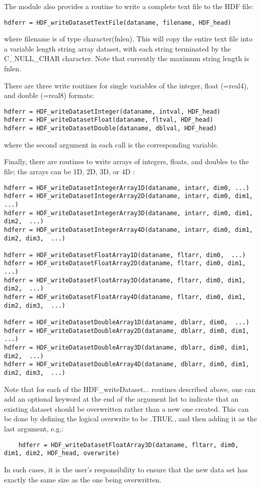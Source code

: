 \documentclass[DIV=calc, paper=letter, fontsize=11pt]{scrartcl}	 %
\begin{document}
The module also provides a routine to write a complete text file to the HDF file:
\begin{verbatim}
hdferr = HDF_writeDatasetTextFile(dataname, filename, HDF_head)
\end{verbatim}
where \textsf{filename} is of type \textsf{character(fnlen)}.  This will copy the entire text file 
into a variable length string array dataset, with each string terminated by the \textsf{C\_NULL\_CHAR}
character.  Note that currently the maximum string length is \textsf{fnlen}.

There are three write routines for single variables of the \textsf{integer}, \textsf{float} (=real4),
and \textsf{double} (=real8) formats:
\begin{verbatim}
hdferr = HDF_writeDatasetInteger(dataname, intval, HDF_head)
hdferr = HDF_writeDatasetFloat(dataname, fltval, HDF_head)
hdferr = HDF_writeDatasetDouble(dataname, dblval, HDF_head)
\end{verbatim}
where the second argument in each call is the corresponding variable.

Finally, there are routines to write arrays of integers, floats, and doubles to the file; the arrays
can be 1D, 2D, 3D, or 4D :
\begin{verbatim}
hdferr = HDF_writeDatasetIntegerArray1D(dataname, intarr, dim0, ...)
hdferr = HDF_writeDatasetIntegerArray2D(dataname, intarr, dim0, dim1,  ...)
hdferr = HDF_writeDatasetIntegerArray3D(dataname, intarr, dim0, dim1, dim2,  ...)
hdferr = HDF_writeDatasetIntegerArray4D(dataname, intarr, dim0, dim1, dim2, dim3,  ...)

hdferr = HDF_writeDatasetFloatArray1D(dataname, fltarr, dim0,  ...)
hdferr = HDF_writeDatasetFloatArray2D(dataname, fltarr, dim0, dim1,  ...)
hdferr = HDF_writeDatasetFloatArray3D(dataname, fltarr, dim0, dim1, dim2,  ...)
hdferr = HDF_writeDatasetFloatArray4D(dataname, fltarr, dim0, dim1, dim2, dim3,  ...)

hdferr = HDF_writeDatasetDoubleArray1D(dataname, dblarr, dim0,  ...)
hdferr = HDF_writeDatasetDoubleArray2D(dataname, dblarr, dim0, dim1,  ...)
hdferr = HDF_writeDatasetDoubleArray3D(dataname, dblarr, dim0, dim1, dim2,  ...)
hdferr = HDF_writeDatasetDoubleArray4D(dataname, dblarr, dim0, dim1, dim2, dim3,  ...)
\end{verbatim}

Note that for each of the \textsf{HDF\_writeDataset...} routines described above, one can add an optional keyword 
at the end of the argument list to indicate that an existing dataset should be overwritten rather than a new one created.
This can be done by defining the logical \textsf{overwrite} to be \textsf{.TRUE.}, and then adding it as the last argument,
e.g.:
{\small\begin{verbatim}
	hdferr = HDF_writeDatasetFloatArray3D(dataname, fltarr, dim0, dim1, dim2, HDF_head, overwrite)
\end{verbatim}}
In such cases, it is the user's responsibility to ensure that the new data set has exactly the same size as the one being overwritten.
\end{document}
